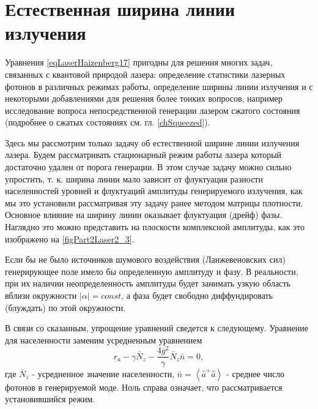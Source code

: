 \section{Естественная ширина линии излучения}
Уравнения \eqref{eqLaserHaizenberg17} пригодны для решения многих
задач, связанных с квантовой природой лазера: определение статистики
лазерных фотонов в различных режимах работы, определение ширины
линии излучения и с некоторыми добавлениями для решения более тонких
вопросов, например исследование вопроса непосредственной генерации
лазером сжатого состояния (подробнее о сжатых состояниях
см. гл. \ref{chSqueezed}). 



Здесь мы рассмотрим только задачу об естественной ширине линии
излучения лазера. Будем рассматривать стационарный режим работы лазера
который достаточно удален от порога генерации. В этом случае задачу
можно сильно упростить, т. к. ширина линии мало зависит от флуктуация
разности населенностей уровней и флуктуаций амплитуды генерируемого
излучения, как мы это установили рассматривая эту задачу ранее методом
матрицы плотности. Основное влияние на ширину линии оказывает
флуктуация (дрейф) фазы. Наглядно это можно представить на плоскости
комплексной амплитуды, как это изображено на
\autoref{figPart2Laser2_3}.

Если бы не было источников шумового воздействия (Ланжевеновских сил)
генерирующее поле имело бы определенную амплитуду и фазу. В
реальности, при их наличии неопределенность амплитуды будет занимать
узкую область вблизи окружности $\left|\alpha\right| = const$, а фаза
будет свободно диффундировать (блуждать) по этой окружности. 

В связи со сказанным, упрощение уравнений сведется к
следующему. Уравнение для населенности заменим усредненным уравнением 
\begin{equation}
r_a - \gamma \bar{N}_z - \frac{4 g^2}{\gamma}\bar{N}_z\bar{n} = 0,
\label{eqLaserHaizenberg19}
\end{equation}
где $\bar{N}_z$ - усредненное значение населенности, $\bar{n} =
\left<\hat{a}^{+}\hat{a}\right>$ - среднее число фотонов в
генерируемой моде. Ноль справа означает, что рассматривается
установившийся режим. 

